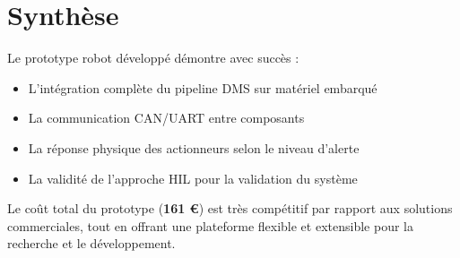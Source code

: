 \section{Synthèse}

Le prototype robot développé démontre avec succès :
\begin{itemize}
    \item L'intégration complète du pipeline DMS sur matériel embarqué
    \item La communication CAN/UART entre composants
    \item La réponse physique des actionneurs selon le niveau d'alerte
    \item La validité de l'approche HIL pour la validation du système
\end{itemize}

Le coût total du prototype (\textbf{161 €}) est très compétitif par rapport aux solutions commerciales, tout en offrant une plateforme flexible et extensible pour la recherche et le développement.
